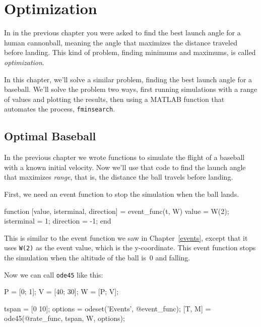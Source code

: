 \chapter{Optimization}


In  in the previous chapter you were asked to find the best launch angle for a human cannonball, meaning the angle that maximizes the distance traveled before landing.  This kind of problem, finding minimums and maximums, is called \emph{optimization}.

In this chapter, we'll solve a similar problem, finding the best launch angle for a baseball.
We'll solve the problem two ways, first running simulations with a range of values and plotting the results, then using a MATLAB function that automates the process, \lstinline{fminsearch}.

\section{Optimal Baseball}

In the previous chapter we wrote functions to simulate the flight of a baseball with a known initial velocity.  Now we'll use that code to find the launch angle that maximizes \emph{range}, that is, the distance the ball travels before landing.


First, we need an event function to stop the simulation when the ball lands.

\begin{code}
function [value, isterminal, direction] = event_func(t, W)
    value = W(2);
    isterminal = 1;
    direction = -1;
end
\end{code}


This is similar to the event function we saw in Chapter~\ref{events}, except that it uses \lstinline{W(2)} as the event value, which is the y-coordinate.  This event function stops the simulation when the altitude of the ball is~0 and falling.

Now we can call \lstinline{ode45} like this:

\begin{code}
    P = [0; 1];       %
    V = [40; 30];     %
    W = [P; V];       %
    
    tspan = [0 10];
    options = odeset('Events', @event_func);
    [T, M] = ode45(@rate_func, tspan, W, options);
\end{code}

